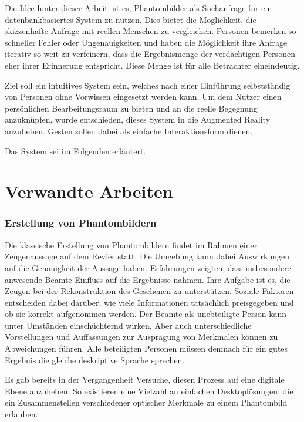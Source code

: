 \documentclass{sigchi-ext}
\begin{document}
Die Idee hinter dieser Arbeit ist es, Phantombilder als Suchanfrage
für ein datenbankbasiertes System zu nutzen. Dies bietet die
Möglichkeit, die skizzenhafte Anfrage mit reellen Menschen zu
vergleichen. Personen bemerken so schneller Fehler oder
Ungenauigkeiten und haben die Möglichkeit ihre Anfrage iterativ so
weit zu verfeinern, dass die Ergebnismenge der verdächtigen Personen
eher ihrer Erinnerung entspricht. Diese Menge ist für alle Betrachter eineindeutig.

Ziel soll ein intuitives System sein, welches nach einer Einführung selbstständig von Personen ohne Vorwissen eingesetzt werden kann. Um dem Nutzer einen persönlichen Bearbeitungsraum zu bieten und an die reelle Begegnung anzuknüpfen, wurde entschieden, dieses System in die Augmented Reality anzuheben. Gesten sollen dabei als einfache Interaktionsform dienen.

Das System sei im Folgenden erläutert.

\section{Verwandte Arbeiten}
\subsubsection{Erstellung von Phantombildern}
Die klassische Erstellung von Phantombildern findet im Rahmen einer Zeugenaussage auf dem Revier statt. Die Umgebung kann dabei Auswirkungen auf die Genauigkeit der Aussage haben. Erfahrungen zeigten, dass insbesondere anwesende Beamte Einfluss auf die Ergebnisse nahmen. Ihre Aufgabe ist es, die Zeugen bei der Rekonstruktion des Gesehenen zu unterstützen. Soziale Faktoren entscheiden dabei darüber, wie viele Informationen tatsächlich preisgegeben und ob sie korrekt aufgenommen werden. Der Beamte als unebteiligte Person kann unter Umständen einschüchternd wirken. Aber auch unterschiedliche Vorstellungen und Auffassungen zur Ausprägung von Merkmalen können zu Abweichungen führen. Alle beteiligten Personen müssen demnach für ein gutes Ergebnis die gleiche deskriptive Sprache sprechen.~\cite{buchholz:stimme}

Es gab bereits in der Vergangenheit Versuche, diesen Prozess auf eine
digitale Ebene anzuheben. So existieren eine Vielzahl an einfachen
Desktoplösungen, die ein Zusammenstellen verschiedener optischer
Merkmale zu einem Phantombild erlauben.~\cite{facette, identikit}
\end{document}
